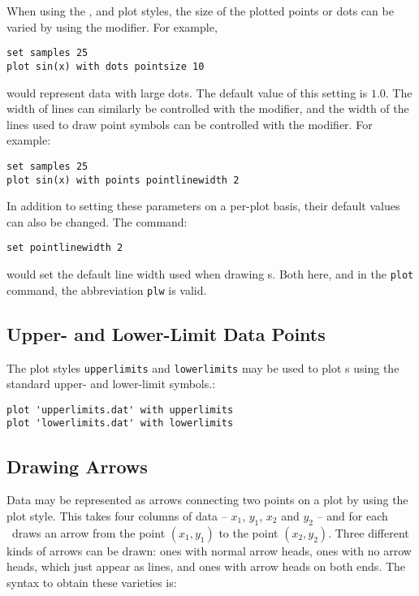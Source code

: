 When using the ,  and  plot
styles, the size of the plotted points or dots can be varied by using the
 modifier. For example,

\begin{verbatim}
set samples 25
plot sin(x) with dots pointsize 10
\end{verbatim}

\noindent would represent data with large dots. The default value of this
setting is $1.0$. The width of lines can similarly be controlled with the
 modifier, and the width of the lines used to draw point
symbols can be controlled with the  modifier. For
example:

\begin{verbatim}
set samples 25
plot sin(x) with points pointlinewidth 2
\end{verbatim}

\noindent In addition to setting these parameters on a per-plot basis, their
default values can also be changed. The command:

\begin{verbatim}
set pointlinewidth 2
\end{verbatim}

\noindent would set the default line width used when drawing \datapoint s. Both
here, and in the {\tt plot} command, the abbreviation {\tt plw} is valid.

\subsection{Upper- and Lower-Limit Data Points}

The plot styles {\tt upperlimits} and {\tt lowerlimits} may be used to plot
\datapoint s using the standard upper- and lower-limit
symbols.:

\begin{verbatim}
plot 'upperlimits.dat' with upperlimits
plot 'lowerlimits.dat' with lowerlimits
\end{verbatim}

\subsection{Drawing Arrows}

Data may be represented as arrows connecting two points on a plot by using the
 plot style.  This takes four columns of data -- $x_1$, $y_1$,
$x_2$ and $y_2$ -- and for each \datapoint\ draws an arrow from the point
$(x_1,y_1)$ to the point $(x_2,y_2)$.  Three different kinds of arrows can be
drawn: ones with normal arrow heads, ones with no arrow heads, which just
appear as lines, and ones with arrow heads on both ends. The syntax to obtain
these varieties is:

